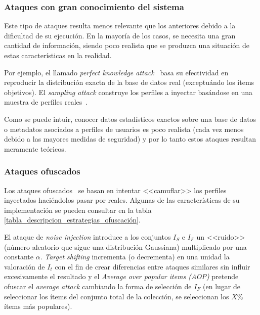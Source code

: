 \subsubsection{Ataques con gran conocimiento del sistema}

Este tipo de ataques resulta menos relevante que los anteriores debido a la dificultad de su ejecución. En la mayoría de los casos, se necesita una gran cantidad de información, siendo poco realista que se produzca una situación de estas características en la realidad.

Por ejemplo, el llamado \textit{perfect knowledge attack}~\cite{Mobasher2006Thesis} basa su efectividad en reproducir la distribución exacta de la base de datos real (exceptuándo los ítems objetivos). El \textit{sampling attack} construye los perfiles a inyectar basándose en una muestra de perfiles reales~\cite{mingdan2018ShillingAttacksAReview}.

Como se puede intuir, conocer datos estadísticos exactos sobre una base de datos o metadatos asociados a perfiles de usuarios es poco realista (cada vez menos debido a las mayores medidas de seguridad) y por lo tanto estos ataques resultan meramente teóricos.

\subsubsection{Ataques ofuscados}

Los ataques ofuscados~\cite{mingdan2018ShillingAttacksAReview} se basan en intentar <<camuflar>> los perfiles inyectados haciéndolos pasar por reales. Algunas de las características de su implementación se pueden consultar en la tabla \ref{tabla_descripcion_estrategias_ofuscación}.

El ataque de \textit{noise injection} introduce a los conjuntos $I_S$ e $I_F$ un <<ruido>> (número aleatorio que sigue una distribución Gaussiana) multiplicado por una constante $\alpha$. \textit{Target shifting} incrementa (o decrementa) en una unidad la valoración de $I_t$ con el fin de crear diferencias entre ataques similares sin influir excesivamente el resultado y el \textit{Average over popular items (AOP)} pretende ofuscar el \textit{average attack} cambiando la forma de selección de $I_F$ (en lugar de seleccionar los ítems del conjunto total de la colección, se seleccionan los $X\%$ ítems más populares).

